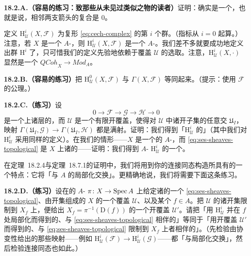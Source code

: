 \textbf{18.2.A.（容易的练习：致那些从未见过类似\trCech\trComplexN{}之物的读者）}\quad 证明：\trCech\trComplexN{}确实是一个\trComplexN，也就是说，相邻两支箭头的复合是 $0$。

定义 $\mathrm{H}^i_{\mathscr{U}}(X,\mathscr{F})$ 为复形 \eqref{eq:cech-complex} 的第 $i$ 个\trCohomology{}群。（指标从 $i=0$ 起算。）注意，若 $X$ 是一个 $A$-\trScheme，则 $\mathrm{H}^i_{\mathscr{U}}(X,\mathscr{F})$ 是一个 $A$-\trModule。我们差不多就要成功地定义出\trCechCohomology{}群 $\mathrm{H}^i$ 了，只可惜我们的定义先验地依赖于覆盖 $\mathscr{U}$ 的选取。注意，$\mathrm{H}^i_{\mathscr{U}}(X,\cdot)$ 显然是一个\trCovariantFunctor{} $\mathit{QCoh}_X\to\mathit{Mod}_A$。

\textbf{18.2.B.（容易的练习）}\quad 把 $\mathrm{H}^0_{\mathscr{U}}(X,\mathscr{F})$ 与 $\Gamma(X,\mathscr{F})$ 等同起来。（提示：使用 $\mathscr{F}$ 的\trSheaf{}公理。）

\textbf{18.2.C.（练习）}\quad 设
\begin{equation*}\tag{18.2.1.2}\label{eq:ses-sheaves-topological}
0\longrightarrow\mathscr{F}\longrightarrow\mathscr{G}\longrightarrow\mathscr{H}\longrightarrow 0
\end{equation*}
是一个\trTopologicalSpace{}上诸\trAbelianGroups{}层的\trShortExactSequence，而 $\mathscr{U}$ 是一个有限开覆盖，使得对 $\mathscr{U}$ 中诸开子集的任意交 $\mathfrak{U}_I$，映射 $\Gamma(\mathfrak{U}_I,\mathscr{G})\to\Gamma(\mathfrak{U}_I,\mathscr{H})$ 都是满射。证明：我们得到「$\mathrm{H}^i_{\mathscr{U}}$ 的\trCohomology{}\trLongExactSequence」（其中我们对 $\mathrm{H}^i_{\mathscr{U}}$ 采用同样的定义）。在我们的情形——$X$ 是一个\trQuasicompact\trSeparated{}的 $A$-\trScheme，而 \eqref{eq:ses-sheaves-topological} 是 $X$ 上诸\trQCSheaf{}的\trShortExactSequence——证明：我们得到 $A$-\trModule{} $\mathrm{H}^i_{\mathscr{U}}$ 的一个\trLongExactSequence。

在\mbox{定理~18.2.4}与\mbox{定理~18.7.1}的证明中，我们将用到你的连接同态构造所具有的一个特点：它将「与 $A$ 的局部化交换」。更精确地说，我们将需要下面这条练习。

\textbf{18.2.D.（练习）}\quad 设在\trQuasicompact\trSeparated{}的 $A$-\trScheme{} $\pi\colon X\to\operatorname{Spec} A$ 上给定诸\trQCSheaf{}的一个\trShortExactSequence{} \eqref{eq:ses-sheaves-topological}、由\trAffine{}开集组成的 $X$ 的一个覆盖 $\mathscr{U}$、以及某个 $f\in A$。把 $\mathscr{U}$ 的诸开集限制到 $X_f$ 上，便给出 $X_f=\pi^{-1}(\mathrm{D}(f))$ 的一个\trAffine{}开覆盖 $\mathscr{U}'$。请把「用 $\mathrm{H}^i_{\mathscr{U}}$ 并在 $f$ 处局部化而得到的、与 \eqref{eq:ses-sheaves-topological} 相伴的\trLongExactSequence」等同于「用\trAffine{}开覆盖 $\mathscr{U}'$ 而得到的、与 \eqref{eq:ses-sheaves-topological} 限制到 $X_f$ 上者相伴的\trLongExactSequence」。（先检验由协变性给出的那些映射——例如 $\mathrm{H}^i_{\mathscr{U}}(\mathscr{F})\to\mathrm{H}^i_{\mathscr{U}}(\mathscr{G})$——都「与局部化交换」，然后检验连接同态也如此。）

